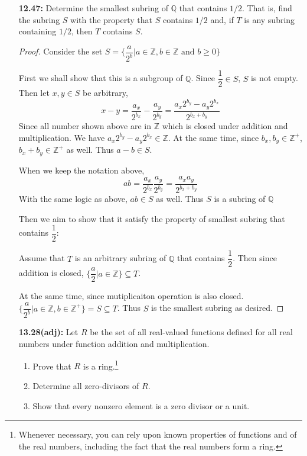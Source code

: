 \documentclass[11pt, oneside]{article}
\newcommand{\Z}{\mathbb Z}
\newcommand{\Q}{\mathbb Q}
\begin{document}
\begin{enumerate}
\newpage
\item[{\bf 12.47:}] Determine the smallest subring of $\Q$ that contains $1/2$. That is, find the subring $S$ with the property that $S$ contains $1/2$ and, if $T$ is any subring containing $1/2$, then $T$ contains $S$.
\begin{proof}
Consider the set $S=\{\dfrac{a}{2^{b}}|a\in \Z, b\in \Z \text{ and } b\geq 0\}$

First we shall show that this is a subgroup of $\Q$. Since $\dfrac{1}{2}\in S$, $S$ is not empty. Then let $x,y\in S$ be arbitrary,
\[x-y=\dfrac{a_x}{2^{b_x}}-\dfrac{a_y}{2^{b_y}}=\dfrac{a_x2^{b_y}-a_y2^{b_x}}{2^{b_x+b_y}}\]
Since all number shown above are in $\Z$ which is closed under addition and multiplication. We have $a_x2^{b_y}-a_y2^{b_x}\in\Z$. At the same time, since $b_x,b_y\in \Z^{+}$, $b_x+b_y\in\Z^+$ as well. Thus $a-b\in S$.

When we keep the notation above, 
\[ab=\dfrac{a_x}{2^{b_x}}\dfrac{a_y}{2^{b_y}}=\dfrac{a_xa_y}{2^{b_x+b_y}}\]
With the same logic as above, $ab\in S$ as well. Thus $S$ is a subring of $\Q$

Then we aim to show that it satisfy the property of smallest subring that contains $\dfrac{1}{2}$:

Assume that $T$ is an arbitrary subring of $\Q$ that contains $\dfrac{1}{2}$. Then since addition is closed, $\{\dfrac{a}{2}|a\in \Z\}\subseteq T$.

At the same time, since mutiplicaiton operation is also closed. $\{\dfrac{a}{2^b}|a\in \Z, b\in \Z^+\}=S\subseteq T$. Thus $S$ is the smallest subring as desired.
\end{proof}


\newpage
\item[{\bf 13.28(adj):}] Let $R$ be the set of all real-valued functions defined for all real numbers under function addition and multiplication.
\begin{enumerate}

\item Prove that $R$ is a ring.\footnote{Whenever necessary, you can rely upon known properties of functions and of the real numbers, including the fact that the real numbers form a ring.}
\item Determine all zero-divisors of $R$.
\item Show that every nonzero element is a zero divisor or a unit.
\end{enumerate}


\end{enumerate}
\end{document}
